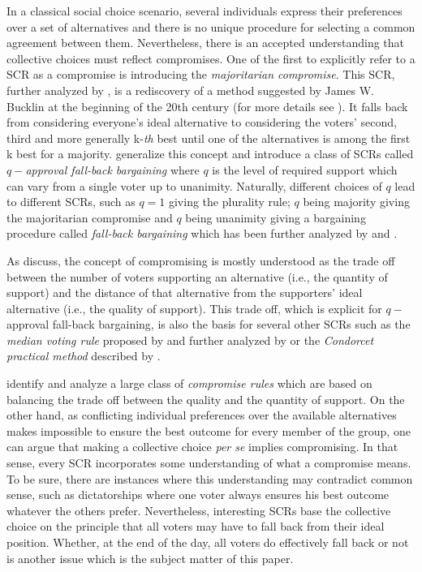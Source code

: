 \documentclass[version=3.21, pagesize, twoside=off, bibliography=totoc, DIV=calc, fontsize=12pt, a4paper]{scrartcl}
\begin{document}
In a classical social choice scenario, several individuals express their preferences over a set of alternatives and there is no unique procedure for selecting a common agreement between them. Nevertheless, there is an accepted understanding that collective choices must reflect compromises. One of the first to explicitly refer to a \ac{SCR} as a compromise is \citet{Sertel1986} introducing the \textit{majoritarian compromise}. This \ac{SCR}, further analyzed by \citet{Sertel1999}, is a rediscovery of a method suggested by James W. Bucklin at the beginning of the 20th century (for more details see \citet{Erdelyi2015}). It falls back from considering everyone’s ideal alternative to considering the voters’ second, third and more generally k-\emph{th} best until one of the alternatives is among the first k best for a majority. \citet{Brams2001} generalize this concept and introduce a class of \acp{SCR} called $q-$\textit{approval fall-back bargaining }where $q$ is the level of required support which can vary from a single voter up to unanimity. Naturally, different choices of $q$ lead to different \acp{SCR}, such as $q=1$ giving the plurality rule; $q$ being majority giving the majoritarian compromise and $q$ being unanimity giving a bargaining procedure called \textit{fall-back bargaining} which has been further analyzed by \citet{Kibris2007} and \citet{Congar2012}. 

As \citet{OezkalSanver2004} discuss, the concept of compromising is mostly understood as the trade off between the number of voters supporting an alternative (i.e., the quantity of support) and the distance of that alternative from the supporters' ideal alternative (i.e., the quality of support). This trade off, which is explicit for $q-$approval fall-back bargaining, is also the basis for several other \acp{SCR} such as the \textit{median voting rule} proposed by \citet{Bassett1999} and further analyzed by \citet{Gehrlein2003} or the \textit{Condorcet practical method }described by \citet{Nurmi1999}.

\citet{Merlin2019} identify and analyze a large class of \textit{compromise rules} which are based on balancing the trade off between the quality and the quantity of support. On the other hand, as conflicting
individual preferences over the available alternatives makes impossible to ensure the best outcome for every member of the group, one can argue that making a collective choice \textit{per se} implies compromising. In that sense, every \ac{SCR} incorporates some understanding of what a compromise means. To be sure, there are instances where this understanding may contradict common sense, such as dictatorships where one voter always ensures his best outcome whatever the others prefer. Nevertheless, interesting \acp{SCR} base the collective choice on the principle that all voters may have to fall back from their ideal position. Whether, at the end of the day, all voters do effectively fall back or not is another issue which is the subject matter of this paper.
\end{document}
